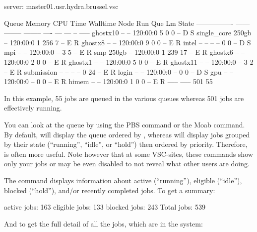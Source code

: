 \begin{prompt}
server: master01.usr.hydra.brussel.vsc

Queue            Memory CPU Time Walltime Node  Run Que Lm  State
---------------- ------ -------- -------- ----  --- --- --  -----
ghostx10           --      --    120:00:0     5   0   0 --   D S
single_core       250gb    --    120:00:0     1 256   7 --   E R
ghostx8            --      --    120:00:0     9   0   0 --   E R
intel              --      --       --      --    0   0 --   D S
mpi                --      --    120:00:0   --    3   5 --   E R
smp               250gb    --    120:00:0     1 239  17 --   E R
ghostx6            --      --    120:00:0     2   0   0 --   E R
ghostx1            --      --    120:00:0     5   0   0 --   E R
ghostx11           --      --    120:00:0   --    3   2 --   E R
submission         --      --       --      --    0  24 --   E R
login              --      --    120:00:0   --    0   0 --   D S
gpu                --      --    120:00:0   --    0   0 --   E R
himem              --      --    120:00:0     1   0   0 --   E R
                                               ----- -----
                                                 501    55
\end{prompt}

  In this example, 55 jobs are queued in the various queues whereas 501 jobs
  are effectively running.

\else  %
  You can look at
  the queue by using the PBS  command or the Moab
   command. By default,  will display the queue
  ordered by , whereas  will display jobs grouped by
  their state (``running'', ``idle'', or ``hold'') then ordered by priority.
  Therefore,  is often more useful.
  Note however that at some VSC-sites, these commands show only your jobs or may
  be even disabled to not reveal what other users are doing.

  The  command displays information about active (``running''),
  eligible (``idle''), blocked (``hold''), and/or recently completed jobs. To get
  a summary:

\begin{prompt}
active jobs: 163
eligible jobs: 133
blocked jobs: 243
Total jobs:  539
\end{prompt}

\fi %

\ifantwerpen
And to get the full detail of all the jobs, which are in the system:

